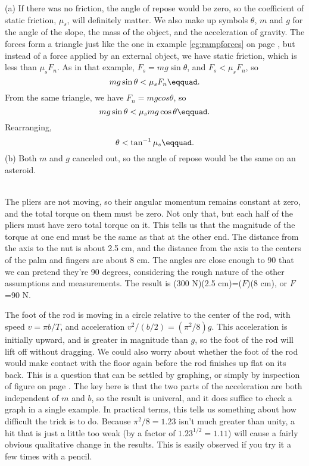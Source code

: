 (a) If there was no friction, the angle of repose would
be zero, so the coefficient of static friction, $\mu_s$, will
definitely matter. We also make up symbols $\theta$, $m$ and $g$ for
the angle of the slope, the mass of the object, and the
acceleration of gravity. The forces form a triangle just
like the one in example \ref{eg:rampforces}
 on page \pageref{eg:rampforces}, but instead of a force applied
by an external object, we have static friction, which is
less than $\mu_sF_n$. As in that example, $F_s=mg \sin \theta$, and
$F_s<\mu_s F_n$, so
\begin{equation*}
	mg \sin \theta<\mu_sF_n\eqquad.
\end{equation*}
From the same triangle, we have $F_n=mg cos \theta$, so
\begin{equation*}
	mg \sin \theta < \mu_s mg \cos \theta\eqquad.
\end{equation*}
Rearranging,
\begin{equation*}
	\theta < \tan^{-1} \mu_s\eqquad.
\end{equation*}
(b) Both $m$ and $g$ canceled out, so the angle of repose would
be the same on an asteroid.

\noindent{}\\
The pliers are not moving, so their angular momentum remains
constant at zero, and the total torque on them must be zero.
Not only that, but each half of the pliers must have zero
total torque on it. This tells us that the magnitude of the
torque at one end must be the same as that at the other end.
The distance from the axis to the nut is about 2.5 cm, and
the distance from the axis to the centers of the palm and
fingers are about 8 cm. The angles are close enough to 90\degunit
that we can pretend they're 90 degrees, considering the
rough nature of the other assumptions and measurements. The
result is (300 N)(2.5 cm)=($F$)(8 cm), or $F$=90 N.

The foot of the rod is moving in a circle relative to the center of the rod,
with speed $v=\pi b/T$, and acceleration $v^2/(b/2)=(\pi^2/8)g$. This acceleration
is initially upward, and is greater in magnitude than $g$, so the foot of the rod
will lift off without dragging. We could also worry about whether the foot of the
rod would make contact with the floor again before the rod finishes up flat on its
back. This is a question that can be settled by graphing, or simply by inspection
of figure  on page \pageref{fig:eg-toppling-rod}. The key here
is that the two parts of the acceleration are both independent of $m$ and $b$, so
the result is univeral, and it does suffice to check a graph in a single example.
In practical terms, this tells us something about how difficult the trick is to
do. Because $\pi^2/8=1.23$ isn't much greater than unity, a hit that is just a
little too weak (by a factor of $1.23^{1/2}=1.11$) will cause
a fairly obvious qualitative change in the results. This is easily observed
if you try it a few times with a pencil.


